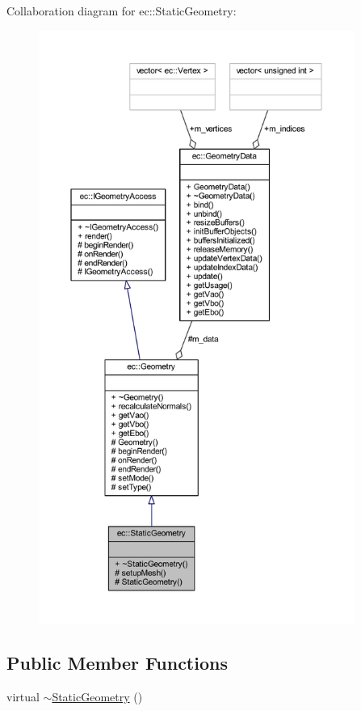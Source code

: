 Collaboration diagram for ec\+:\+:Static\+Geometry\+:\nopagebreak
\begin{figure}[H]
\begin{center}
\leavevmode
\includegraphics[height=550pt]{classec_1_1_static_geometry__coll__graph}
\end{center}
\end{figure}
\subsection*{Public Member Functions}
\begin{DoxyCompactItemize}
\item 
virtual \mbox{\hyperlink{classec_1_1_static_geometry_a47d1f09c1042762be9a9d4a492db2366}{$\sim$\+Static\+Geometry}} ()
\end{DoxyCompactItemize}
